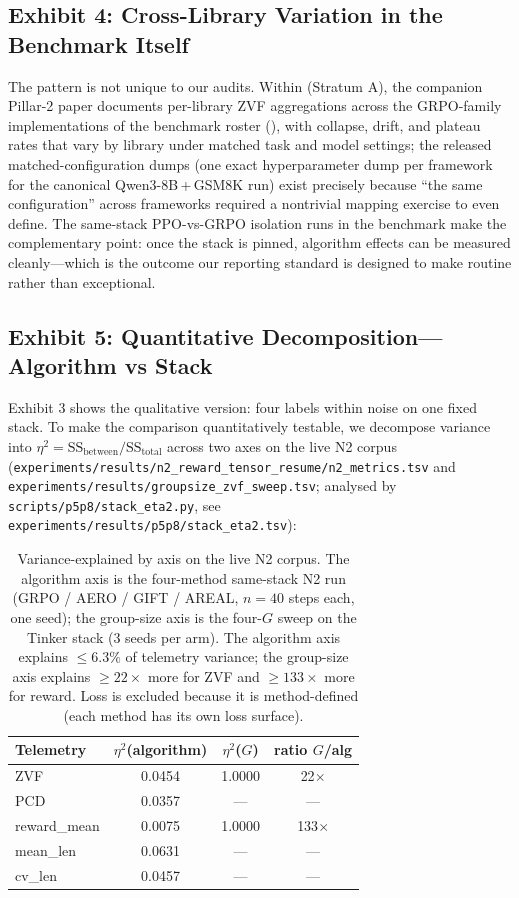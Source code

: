 \subsection{Exhibit 4: Cross-Library Variation in the Benchmark Itself}
\label{sec:p5-exhibit-library}
The pattern is not unique to our audits. Within \ours{} (Stratum A), the
companion Pillar-2 paper documents per-library ZVF aggregations across the
GRPO-family implementations of the benchmark roster
(), with collapse, drift, and plateau rates that
vary by library under matched task and model settings; the released
matched-configuration dumps (one exact hyperparameter dump per framework for
the canonical Qwen3-8B\,+\,GSM8K run) exist precisely because ``the same
configuration'' across frameworks required a nontrivial mapping exercise to
even define. The same-stack PPO-vs-GRPO isolation runs in the benchmark make
the complementary point: once the stack is pinned, algorithm effects can be
measured cleanly---which is the outcome our reporting standard is designed to
make routine rather than exceptional.

\subsection{Exhibit 5: Quantitative Decomposition---Algorithm vs Stack}
\label{sec:p5-exhibit-eta2}
Exhibit 3 shows the qualitative version: four labels within noise on one
fixed stack. To make the comparison quantitatively testable, we decompose
variance into $\eta^{2} = \mathrm{SS}_{\text{between}} / \mathrm{SS}_{\text{total}}$
across two axes on the live N2 corpus
(\texttt{experiments/results/n2\_reward\_tensor\_resume/n2\_metrics.tsv} and
\texttt{experiments/results/groupsize\_zvf\_sweep.tsv}; analysed by
\texttt{scripts/p5p8/stack\_eta2.py}, see
\texttt{experiments/results/p5p8/stack\_eta2.tsv}):

\begin{table}[t]
\centering
\caption{Variance-explained by axis on the live N2 corpus. The algorithm
axis is the four-method same-stack N2 run (GRPO / AERO / GIFT / AREAL,
$n=40$ steps each, one seed); the group-size axis is the four-$G$ sweep on
the Tinker stack (3 seeds per arm). The algorithm axis explains $\le 6.3\%$
of telemetry variance; the group-size axis explains $\ge 22\times$ more for
ZVF and $\ge 133\times$ more for reward. Loss is excluded because it is
method-defined (each method has its own loss surface).}
\label{tab:p5-eta2}
\small
\begin{tabular}{@{}lccc@{}}
\toprule
Telemetry & $\eta^{2}$(algorithm) & $\eta^{2}$($G$) & ratio $G$/alg \\
\midrule
ZVF       & 0.0454 & 1.0000 & 22$\times$  \\
PCD       & 0.0357 & ---    & ---    \\
reward\_mean & 0.0075 & 1.0000 & 133$\times$ \\
mean\_len  & 0.0631 & ---    & ---    \\
cv\_len    & 0.0457 & ---    & ---    \\
\bottomrule
\end{tabular}
\end{table}

